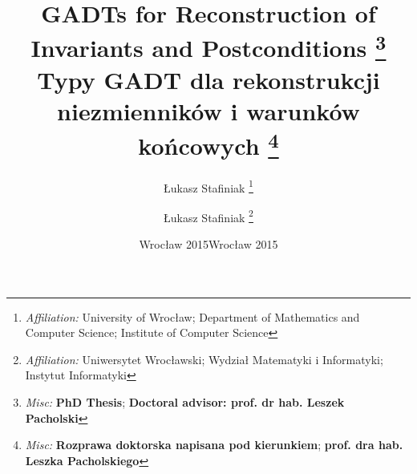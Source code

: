\documentclass{article}
\newcommand{\tmSep}{; }
\newcommand{\tmaffiliation}[1]{\thanks{\textit{Affiliation:} #1}}
\newcommand{\tmmisc}[1]{\thanks{\textit{Misc:} #1}}
\newcommand{\tmstrong}[1]{\textbf{#1}}
\begin{document}
\title{
  GADTs for Reconstruction of Invariants and Postconditions
  \tmmisc{{\tmstrong{PhD Thesis}}{\tmSep}
  {\tmstrong{Doctoral advisor: prof. dr hab. Leszek Pacholski}}}
}

\author{
  {\L}ukasz Stafiniak
  \tmaffiliation{University of Wroc{\l}aw{\tmSep}
  Department of Mathematics and Computer Science{\tmSep}
  Institute of Computer Science}
}

\date{Wroc{\l}aw 2015}

\maketitle

\title{
  Typy GADT dla rekonstrukcji niezmiennik{\'o}w i warunk{\'o}w
  ko{\'n}{\nobreak}cowych
  \tmmisc{{\tmstrong{Rozprawa doktorska napisana pod kierunkiem}}{\tmSep}
  {\tmstrong{prof. dra hab. Leszka Pacholskiego}}}
}

\author{
  {\L}ukasz Stafiniak
  \tmaffiliation{Uniwersytet Wroc{\l}awski{\tmSep}
  Wydzia{\l} Matematyki i Informatyki{\tmSep}
  Instytut Informatyki}
}

\date{Wroc{\l}aw 2015}

\maketitle
\end{document}
